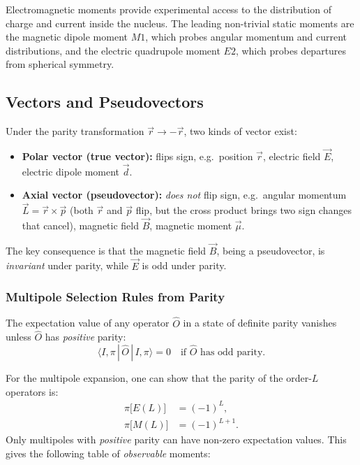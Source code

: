 Electromagnetic moments provide experimental access to the distribution of charge and current inside the nucleus.  The leading non-trivial static moments are the magnetic dipole moment \(M1\), which probes angular momentum and current distributions, and the electric quadrupole moment \(E2\), which probes departures from spherical symmetry.

\subsection*{Vectors and Pseudovectors}

Under the parity transformation $\vec{r}\to-\vec{r}$, two kinds of vector exist:
\begin{itemize}
  \item \textbf{Polar vector (true vector):} flips sign, e.g.\ position $\vec{r}$, electric field $\vec{E}$, electric dipole moment $\vec{d}$.
  \item \textbf{Axial vector (pseudovector):} \emph{does not} flip sign, e.g.\ angular momentum $\vec{L} = \vec{r}\times\vec{p}$ (both $\vec{r}$ and $\vec{p}$ flip, but the cross product brings two sign changes that cancel), magnetic field $\vec{B}$, magnetic moment $\vec{\mu}$.
\end{itemize}
The key consequence is that the magnetic field $\vec{B}$, being a pseudovector, is \emph{invariant} under parity, while $\vec{E}$ is odd under parity.

\subsubsection*{Multipole Selection Rules from Parity}

The expectation value of any operator $\hat{O}$ in a state of definite parity vanishes unless $\hat{O}$ has \emph{positive} parity:
\begin{equation}
  \label{eq:parity_selection}
  \langle I,\pi \,|\, \hat{O} \,|\, I,\pi \rangle = 0
  \quad \text{if } \hat{O} \text{ has odd parity}.
\end{equation}

For the multipole expansion, one can show that the parity of the order-$L$ operators is:
\begin{align}
  \pi\bigl[E(L)\bigr] &= (-1)^L, \label{eq:parity_EL}\\
  \pi\bigl[M(L)\bigr] &= (-1)^{L+1}. \label{eq:parity_ML}
\end{align}
Only multipoles with \emph{positive} parity can have non-zero expectation values.  This gives the following table of \emph{observable} moments:

